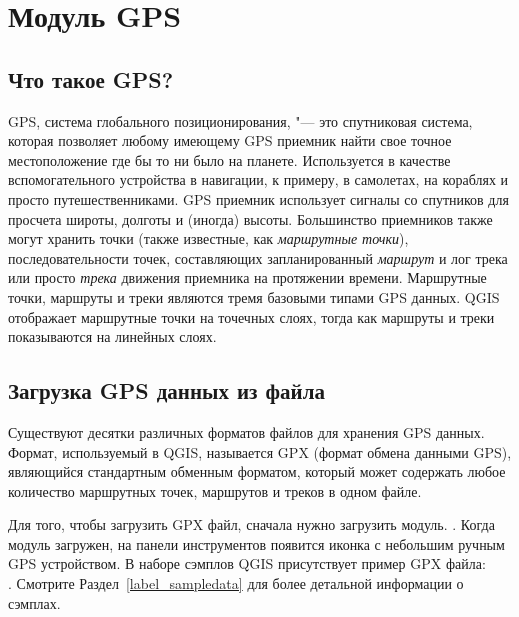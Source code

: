 
\section{Модуль GPS}\label{label_plugingps}


\subsection{Что такое GPS?}\label{whatsgps}

GPS, система глобального позиционирования, "--- это спутниковая система,
которая позволяет любому имеющему GPS приемник найти свое точное
местоположение где бы то ни было на планете. Используется в качестве
вспомогательного устройства в навигации, к примеру, в самолетах, на
кораблях и просто путешественниками. GPS приемник использует сигналы со
спутников для просчета широты, долготы и (иногда) высоты. Большинство
приемников также могут хранить точки (также известные, как
\emph{маршрутные точки}), последовательности точек, составляющих
запланированный \emph{маршрут} и лог трека или просто \emph{трека}
движения приемника на протяжении времени. Маршрутные точки, маршруты и
треки являются тремя базовыми типами GPS данных. QGIS отображает
маршрутные точки на точечных слоях, тогда как маршруты и треки
показываются на линейных слоях.

\subsection{Загрузка GPS данных из файла}\label{label_loadgps}

Существуют десятки различных форматов файлов для хранения GPS данных.
Формат, используемый в QGIS, называется GPX (формат обмена данными GPS),
являющийся стандартным обменным форматом, который может содержать любое
количество маршрутных точек, маршрутов и треков в одном файле.

Для того, чтобы загрузить GPX файл, сначала нужно загрузить модуль.
 \arrow
{} \arrow
{}.
Когда модуль загружен, на панели инструментов появится иконка с
небольшим ручным GPS устройством. В наборе сэмплов QGIS присутствует
пример GPX файла: \\
.
Смотрите Раздел~\ref{label_sampledata} для более детальной информации
о сэмплах.

